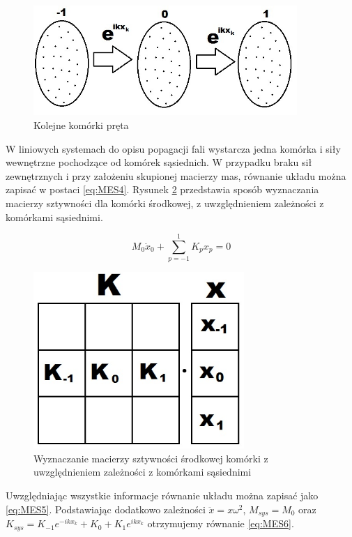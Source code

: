 \begin{figure}[h]
\centering
\includegraphics[width=10cm]{Zdjecia/2/metoda_numeryczna3}
\caption{Kolejne komórki pręta}
\label{fig:komorki_preta}
\end{figure}

W liniowych systemach do opisu popagacji fali wystarcza jedna komórka i siły wewnętrzne pochodzące od komórek sąsiednich. W przypadku braku sił zewnętrznych i przy założeniu skupionej macierzy mas, równanie układu można zapisać w postaci \ref{eq:MES4}. Rysunek \ref{fig:komorki_preta_sztywnosc} przedstawia sposób wyznaczania macierzy sztywności dla komórki środkowej, z uwzględnieniem zależności z komórkami sąsiednimi.

\begin{equation} \label{eq:MES4}
M_0\ddot x_0 + \sum_{p=-1}^1 K_p x_p = 0
\end{equation}

\begin{figure}[h]
\centering
\includegraphics[width=8cm]{Zdjecia/2/metoda_numeryczna3_sztywnosc}
\caption{Wyznaczanie macierzy sztywności środkowej komórki z uwzględnieniem zależności z komórkami sąsiednimi}
\label{fig:komorki_preta_sztywnosc}
\end{figure}

Uwzględniając wszystkie informacje równanie układu można zapisać jako \ref{eq:MES5}. Podstawiając dodatkowo zależności \( \ddot x = x \omega^2 \), \( M_{sys} = M_0 \) oraz \( K_{sys} = K_{-1} e^{-ikx_k} + K_0 + K_1 e^{ikx_k} \) otrzymujemy równanie \ref{eq:MES6}.

